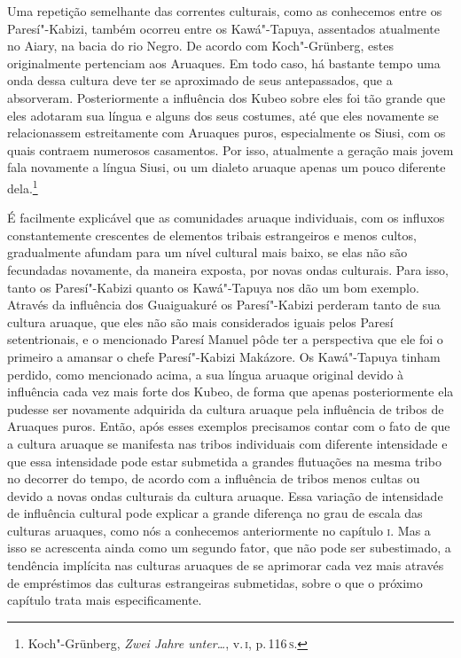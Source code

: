 Uma repetição semelhante das correntes culturais, como as conhecemos
entre os Paresí"-Kabizi, também ocorreu entre os Kawá"-Tapuya, assentados
atualmente no Aiary, na bacia do rio Negro. De acordo com Koch"-Grünberg,
estes originalmente pertenciam aos Aruaques. Em todo caso, há bastante
tempo uma onda dessa cultura deve ter se aproximado de seus
antepassados, que a absorveram. Posteriormente a influência dos Kubeo
sobre eles foi tão grande que eles adotaram sua língua e alguns dos seus
costumes, até que eles novamente se relacionassem estreitamente com
Aruaques puros, especialmente os Siusi, com os quais contraem numerosos
casamentos. Por isso, atualmente a geração mais jovem fala novamente a
língua Siusi, ou um dialeto aruaque apenas um pouco diferente
dela.\footnote{Koch"-Grünberg, \textit{Zwei Jahre unter\ldots}, v.\,\textsc{i}, p.\,116\,\textsc{s}.}

É facilmente explicável que as comunidades aruaque individuais, com os
influxos constantemente crescentes de elementos tribais estrangeiros e
menos cultos, gradualmente afundam para um nível cultural mais baixo,
se elas não são fecundadas novamente, da maneira exposta, por novas
ondas culturais. Para isso, tanto os Paresí"-Kabizi quanto os
Kawá"-Tapuya nos dão um bom exemplo. Através da influência dos
Guaiguakuré os Paresí"-Kabizi perderam tanto de sua cultura aruaque, que
eles não são mais considerados iguais pelos Paresí setentrionais, e o
mencionado Paresí Manuel pôde ter a perspectiva que ele foi o primeiro a
amansar o chefe Paresí"-Kabizi Makázore. Os Kawá"-Tapuya tinham perdido,
como mencionado acima, a sua língua aruaque original devido à
influência cada vez mais forte dos Kubeo, de forma que apenas
posteriormente ela pudesse ser novamente adquirida da cultura aruaque
pela influência de tribos de Aruaques puros. Então, após esses exemplos
precisamos contar com o fato de que a cultura aruaque se manifesta nas
tribos individuais com diferente intensidade e que essa intensidade pode
estar submetida a grandes flutuações na mesma tribo no decorrer do
tempo, de acordo com a influência de tribos menos cultas ou devido a
novas ondas culturais da cultura aruaque. Essa variação de intensidade
de influência cultural pode explicar a grande diferença no grau de
escala das culturas aruaques, como nós a conhecemos anteriormente no
capítulo \textsc{i}. Mas a isso se acrescenta ainda como um segundo fator, que
não pode ser subestimado, a tendência implícita nas culturas aruaques de
se aprimorar cada vez mais através de empréstimos das culturas
estrangeiras submetidas, sobre o que o próximo capítulo trata mais
especificamente.




